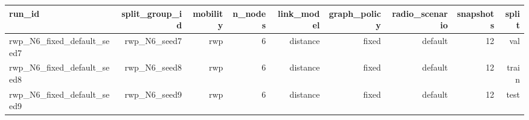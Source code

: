 \begin{tabular}{lrrrrrrrr}
\toprule
run\_id & split\_group\_id & mobility & n\_nodes & link\_model & graph\_policy & radio\_scenario & snapshots & split \\
\midrule
rwp\_N6\_fixed\_default\_seed7 & rwp\_N6\_seed7 & rwp & 6 & distance & fixed & default & 12 & val \\
rwp\_N6\_fixed\_default\_seed8 & rwp\_N6\_seed8 & rwp & 6 & distance & fixed & default & 12 & train \\
rwp\_N6\_fixed\_default\_seed9 & rwp\_N6\_seed9 & rwp & 6 & distance & fixed & default & 12 & test \\
\bottomrule
\end{tabular}